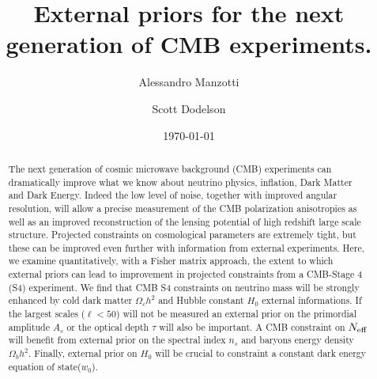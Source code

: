 \documentclass[aps,prd,reprint,superscriptaddress]{revtex4-1}
\begin{document}
\graphicspath{{images/}}

\title{External priors for the next generation of CMB experiments.}

\author{Alessandro Manzotti}
\author{Scott Dodelson}


\date{\today}
\begin{abstract}
The next generation of cosmic microwave background (CMB) experiments can dramatically improve what we know about neutrino physics, inflation, Dark Matter and Dark Energy. 
Indeed the low level of noise, together with improved angular resolution, will allow a precise measurement of the CMB polarization anisotropies as well as an improved reconstruction of the lensing potential of high redshift large scale structure. 
Projected constraints on cosmological parameters are extremely tight, but these can be improved even further with information from external experiments. Here, we examine quantitatively, with a Fisher matrix approach, the extent to which external priors can lead to improvement in projected constraints from a CMB-Stage 4 (S4) experiment.
We find that CMB S4 constraints on neutrino mass will be strongly enhanced by cold dark matter $\Omega_{c}h^{2}$ and Hubble constant $H_{0}$ external informations. If the largest scales ($\ell<50$) will not be measured an external prior on the primordial amplitude $A_{s}$ or the optical depth $\tau$ will also be important. A CMB constraint on $N_{\rm eff}$ will benefit from external prior on the spectral index $n_{s}$ and baryons energy density $\Omega_{b}h^{2}$. Finally, external prior on $H_{0}$ will be crucial to constraint a constant dark energy equation of state($w_{0}$).
\end{abstract}

\pacs{}
\maketitle
\end{document}
